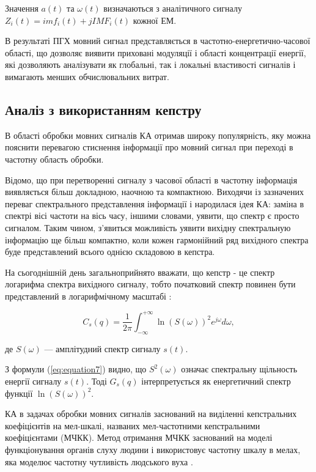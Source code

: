 Значення $a(t)$ та $\omega(t)$ визначаються з аналітичного сигналу $Z_i(t)=imf_i(t)+jIMF_i(t)$ кожної ЕМ.

В результаті ПГХ мовний сигнал представляється в частотно-енергетично-часової області, що дозволяє виявити приховані модуляції і області концентрації енергії, які дозволяють аналізувати як глобальні, так і локальні властивості сигналів і вимагають менших обчислювальних витрат.

\subsection{Аналіз з використанням кепстру}

В області обробки мовних сигналів КА отримав широку популярність, яку можна пояснити перевагою стиснення інформації про мовний сигнал при переході в частотну область обробки.

Відомо, що при перетворенні сигналу з часової області в частотну інформація виявляється більш докладною, наочною та компактною. Виходячи із зазначених переваг спектрального представлення інформації і народилася ідея КА: заміна в спектрі вісі частоти на вісь часу, іншими словами, уявити, що спектр є просто сигналом. Таким чином, з'явиться можливість уявити вихідну спектральную інформацію ще більш компактно, коли кожен гармонійний ряд вихідного спектра буде представлений всього однією складовою в кепстра.

На сьогоднішній день загальноприйнято вважати, що кепстр - це спектр логарифма спектра вихідного сигналу, тобто початковий спектр повинен бути представлений в логарифмічному масштабі \cite{Козлов_2013}:

\begin{equation}
\label{eq:equation7}
C_s(q)=\frac{1}{2\pi}\int_{-\infty}^{+\infty}\ln(S(\omega))^2e^{j\omega}d\omega,
\end{equation}

\noindent
де $S(\omega)$ --- амплітудний спектр сигналу $s(t)$.

З формули (\ref{eq:equation7}) видно, що $S^2(\omega)$ означає спектральну щільность енергії сигналу $s(t)$. Тоді $G_s(q)$ інтерпретується як енергетичний спектр функції $\ln(S(\omega))^2$.

КА в задачах обробки мовних сигналів заснований на виділенні кепстральних коефіцієнтів на мел-шкалі, названих мел-частотними кепстральними коефіцієнтами (МЧКК). Метод отримання МЧКК заснований на моделі функціонування органів слуху людини і використовує частотну шкалу в мелах, яка моделює частотну чутливість людського вуха \cite{Huang_2001}.

